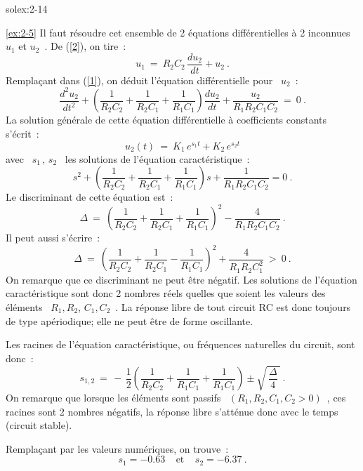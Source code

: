 \begin{exwithsol}{solex:2-14}
\begin{solexercise}{\ref{ex:2-5}}
Il faut r\'esoudre cet ensemble de 2 \'equations diff\'erentielles \`a 2
inconnues \ $u_1$ et $u_2$~.
De (\ref{2}), on tire~:
\begin{equation}
u_1 \: = \: R_2C_2 \, \dfrac{du_2}{dt} + u_2~.\label{3}
\end{equation}
Rempla\c{c}ant dans (\ref{1}), on d\'eduit l'\'equation diff\'erentielle
pour \ $u_2$~:
\[ \dfrac{d^2u_2}{dt^2} + \left( \dfrac{1}{R_2C_2} + \dfrac{1}{R_2C_1} 
+ \dfrac{1}{R_1C_1} \right) \dfrac{du_2}{dt} +
\dfrac{u_2}{R_1R_2C_1C_2} \: = \: 0~. \] La solution g\'en\'erale de cette
\'equation diff\'erentielle \`a coefficients constants s'\'ecrit~:
\[ u_2(t) \: = \: K_1\, e^{s_1t} + K_2\, e^{s_2t} \]
avec \ $s_1\, , \, s_2$ \ les solutions de l'\'equation caract\'eristique~:
\[ s^2 + \left( \dfrac{1}{R_2C_2} + \dfrac{1}{R_2C_1} + \dfrac{1}{R_1C_1} \right) s
+ \frac{1}{R_1R_2C_1C_2}=0~. \]
Le discriminant de cette \'equation est~:
\[  \Delta \: = \: \left( \dfrac{1}{R_2C_2} + \dfrac{1}{R_2C_1} 
+ \dfrac{1}{R_1C_1} \right)^2 - \dfrac{4}{R_1R_2C_1C_2}~. \]
Il peut aussi s'\'ecrire~:
\[  \Delta \: = \: \left( \dfrac{1}{R_2C_2} + \dfrac{1}{R_2C_1} 
- \dfrac{1}{R_1C_1} \right)^2 + \dfrac{4}{R_1R_2C_1^2}\: > \ 0~. \] On
remarque que ce discriminant ne peut \^etre n\'egatif. Les solutions de
l'\'equation caract\'eristique sont donc 2 nombres r\'eels quelles que
soient les valeurs des \'el\'ements \ $R_1,R_2$, $C_1,C_2$~. La r\'eponse libre
de tout circuit RC est donc toujours de type ap\'eriodique; elle ne peut
\^etre de forme oscillante.

Les racines de l'\'equation caract\'eristique, ou fr\'equences naturelles du
circuit, sont donc~:
\[ s_{1,2} \: = \, -\, \dfrac{1}{2} \left( \dfrac{1}{R_2C_2} + \dfrac{1}{R_1C_1} 
+ \dfrac{1}{R_1C_1} \right) \pm \sqrt{\,\dfrac{\Delta}{4}~}~. \] On
remarque que lorsque les \'el\'ements sont passifs \ $(R_1,R_2,C_1,C_2 >
0)$~, ces racines sont 2 nombres n\'egatifs, la r\'eponse libre s'att\'enue
donc avec le temps (circuit stable).

Rempla\c{c}ant par les valeurs num\'eriques, on trouve~:
\[ s_1 = -0.63~~~~~\mbox{et}~~~~~s_2 = -6.37~.\]


\end{solexercise}
\end{exwithsol}
